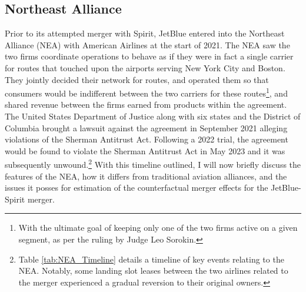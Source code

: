 \documentclass{article}
\begin{document}
	\subsection{Northeast Alliance}
	\label{sec:Setting_NEA}
	
	Prior to its attempted merger with Spirit, JetBlue entered into the Northeast Alliance (NEA) with American Airlines at the start of 2021. The NEA saw the two firms coordinate operations to behave as if they were in fact a single carrier for routes that touched upon the airports serving New York City and Boston. They jointly decided their network for routes, and operated them so that consumers would be indifferent between the two carriers for these routes\footnote{With the ultimate goal of keeping only one of the two firms active on a given segment, as per the ruling by Judge Leo Sorokin.}, and shared revenue between the firms earned from products within the agreement. The United States Department of Justice along with six states and the District of Columbia brought a lawsuit against the agreement in September 2021 alleging violations of the Sherman Antitrust Act. Following a 2022 trial, the agreement would be found to violate the Sherman Antitrust Act in May 2023 and it was subsequently unwound\citep{rennison_jetblue-american_2023, rains_what_2023}.\footnote{Table \ref{tab:NEA_Timeline} details a timeline of key events relating to the NEA. Notably, some landing slot leases between the two airlines related to the merger experienced a gradual reversion to their original owners.} With this timeline outlined, I will now briefly discuss the features of the NEA, how it differs from traditional aviation alliances, and the issues it posses for estimation of the counterfactual merger effects for the JetBlue-Spirit merger. 
\end{document}
